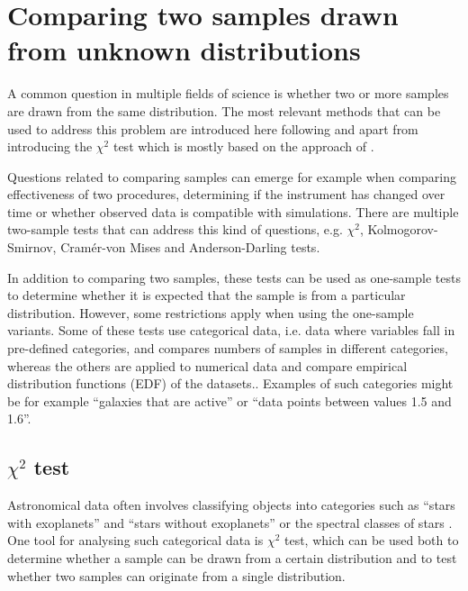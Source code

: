 \documentclass[english, oneside]{HYgradu}
\begin{document}
\section{Comparing two samples drawn from unknown distributions}
A common question in multiple fields of science is whether two or more samples are drawn from the same distribution. The most relevant methods that can be used to address this problem are introduced here following \citet{bohm2010introduction} and \citet{feigelson2012modern} apart from introducing the $\chi^2$ test which is mostly based on the approach of \citet{corder2014nonparametric}.

Questions related to comparing samples can emerge for example when comparing effectiveness of two procedures, determining if the instrument has changed over time or whether observed data is compatible with simulations. There are multiple two-sample tests that can address this kind of questions, e.g. $\chi^2$, Kolmogorov-Smirnov, Cram\'er-von Mises and Anderson-Darling tests. 

In addition to comparing two samples, these tests can be used as one-sample tests to determine whether it is expected that the sample is from a particular distribution. However, some restrictions apply when using the one-sample variants. Some of these tests use categorical data, i.e. data where variables fall in pre-defined categories, and compares numbers of samples in different categories, whereas the others are applied to numerical data and compare empirical distribution functions (EDF) of the datasets.. Examples of such categories might be for example ``galaxies that are active'' or ``data points between values 1.5 and 1.6''.


\subsection{$\chi^2$ test}
Astronomical data often involves classifying objects into categories such as ``stars with exoplanets'' and ``stars without exoplanets'' or the spectral classes of stars  \citep{feigelson2012modern}. One tool for analysing such categorical data is $\chi^2$ test, which can be used both to determine whether a sample can be drawn from a certain distribution and to test whether two samples can originate from a single distribution. 
\end{document}
